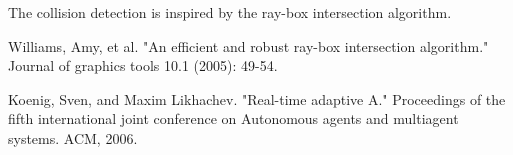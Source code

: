 \documentclass{article} %
\begin{document}
The collision detection is inspired by the ray-box intersection algorithm\cite{raybox}.

\begin{thebibliography}{999}

    Williams, Amy, et al. "An efficient and robust ray-box intersection algorithm." Journal of graphics tools 10.1 (2005): 49-54.

    Koenig, Sven, and Maxim Likhachev. "Real-time adaptive A." Proceedings of the fifth international joint conference on Autonomous agents and multiagent systems. ACM, 2006.
    
\end{thebibliography}
    
\end{document}
